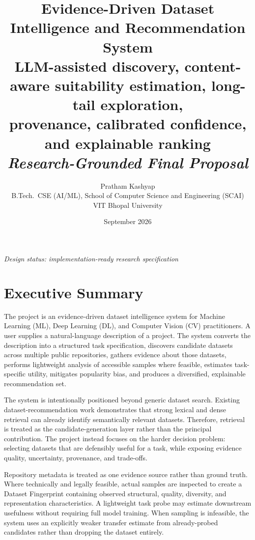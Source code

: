 \documentclass[11pt]{article}
\title{\vspace{-1.5cm}\textbf{\Large Evidence-Driven Dataset Intelligence and Recommendation System}\\[4pt]
\large LLM-assisted discovery, content-aware suitability estimation, long-tail exploration,\\ provenance, calibrated confidence, and explainable ranking\\[10pt]
\normalsize\textit{Research-Grounded Final Proposal}}
\author{Pratham Kashyap \\ \small B.Tech.\ CSE (AI/ML), School of Computer Science and Engineering (SCAI) \\ \small VIT Bhopal University}
\date{September 2026}
\begin{document}
\maketitle
\thispagestyle{empty}

\begin{center}
\textit{Design status: implementation-ready research specification}
\end{center}

\vspace{0.3cm}
\tableofcontents
\newpage

\section{Executive Summary}
The project is an evidence-driven dataset intelligence system for Machine Learning (ML), Deep Learning
(DL), and Computer Vision (CV) practitioners. A user supplies a natural-language description of a project.
The system converts the description into a structured task specification, discovers candidate datasets
across multiple public repositories, gathers evidence about those datasets, performs lightweight analysis
of accessible samples where feasible, estimates task-specific utility, mitigates popularity bias, and
produces a diversified, explainable recommendation set.

The system is intentionally positioned beyond generic dataset search. Existing dataset-recommendation work
demonstrates that strong lexical and dense retrieval can already identify semantically relevant datasets.
Therefore, retrieval is treated as the candidate-generation layer rather than the principal contribution.
The project instead focuses on the harder decision problem: selecting datasets that are defensibly useful
for a task, while exposing evidence quality, uncertainty, provenance, and trade-offs.

Repository metadata is treated as one evidence source rather than ground truth. Where technically and
legally feasible, actual samples are inspected to create a Dataset Fingerprint containing observed
structural, quality, diversity, and representation characteristics. A lightweight task probe may estimate
downstream usefulness without requiring full model training. When sampling is infeasible, the system uses
an explicitly weaker transfer estimate from already-probed candidates rather than dropping the dataset
entirely.
\end{document}
